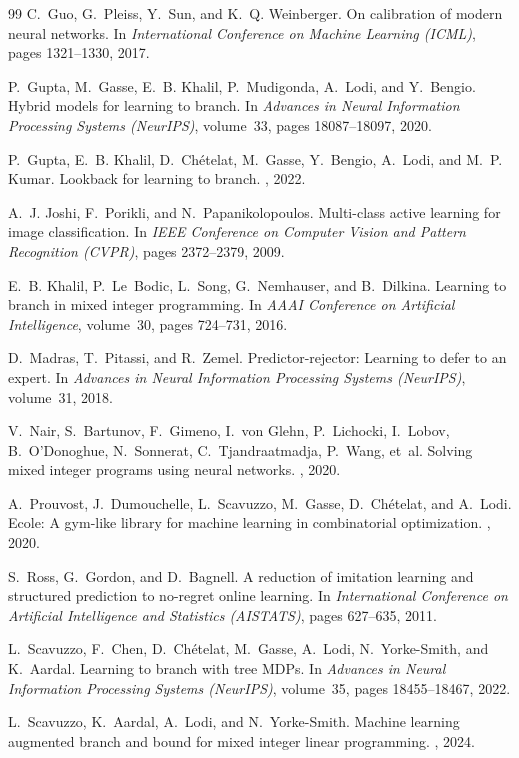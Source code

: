 \documentclass[10pt,twocolumn,letterpaper]{article}
\theoremstyle{plain}
\theoremstyle{definition}
\theoremstyle{remark}
\begin{document}
\begin{thebibliography}{99}
C.~Guo, G.~Pleiss, Y.~Sun, and K.~Q. Weinberger.
\newblock On calibration of modern neural networks.
\newblock In {\em International Conference on Machine Learning (ICML)}, pages 1321--1330, 2017.

P.~Gupta, M.~Gasse, E.~B. Khalil, P.~Mudigonda, A.~Lodi, and Y.~Bengio.
\newblock Hybrid models for learning to branch.
\newblock In {\em Advances in Neural Information Processing Systems (NeurIPS)}, volume~33, pages 18087--18097, 2020.

P.~Gupta, E.~B. Khalil, D.~Ch{\'e}telat, M.~Gasse, Y.~Bengio, A.~Lodi, and M.~P. Kumar.
\newblock Lookback for learning to branch.
, 2022.

A.~J. Joshi, F.~Porikli, and N.~Papanikolopoulos.
\newblock Multi-class active learning for image classification.
\newblock In {\em IEEE Conference on Computer Vision and Pattern Recognition (CVPR)}, pages 2372--2379, 2009.

E.~B. Khalil, P.~Le~Bodic, L.~Song, G.~Nemhauser, and B.~Dilkina.
\newblock Learning to branch in mixed integer programming.
\newblock In {\em AAAI Conference on Artificial Intelligence}, volume~30, pages 724--731, 2016.

D.~Madras, T.~Pitassi, and R.~Zemel.
\newblock Predictor-rejector: Learning to defer to an expert.
\newblock In {\em Advances in Neural Information Processing Systems (NeurIPS)}, volume~31, 2018.

V.~Nair, S.~Bartunov, F.~Gimeno, I.~von Glehn, P.~Lichocki, I.~Lobov, B.~O'Donoghue, N.~Sonnerat, C.~Tjandraatmadja, P.~Wang, et~al.
\newblock Solving mixed integer programs using neural networks.
, 2020.

A.~Prouvost, J.~Dumouchelle, L.~Scavuzzo, M.~Gasse, D.~Ch{\'e}telat, and A.~Lodi.
\newblock Ecole: A gym-like library for machine learning in combinatorial optimization.
, 2020.

S.~Ross, G.~Gordon, and D.~Bagnell.
\newblock A reduction of imitation learning and structured prediction to no-regret online learning.
\newblock In {\em International Conference on Artificial Intelligence and Statistics (AISTATS)}, pages 627--635, 2011.

L.~Scavuzzo, F.~Chen, D.~Ch{\'e}telat, M.~Gasse, A.~Lodi, N.~Yorke-Smith, and K.~Aardal.
\newblock Learning to branch with tree {MDPs}.
\newblock In {\em Advances in Neural Information Processing Systems (NeurIPS)}, volume~35, pages 18455--18467, 2022.

L.~Scavuzzo, K.~Aardal, A.~Lodi, and N.~Yorke-Smith.
\newblock Machine learning augmented branch and bound for mixed integer linear programming.
, 2024.

\end{thebibliography}
\end{document}
